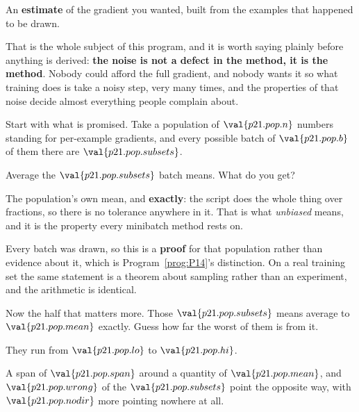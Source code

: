 \begin{fr}
\begin{ansblock}
An \textbf{estimate} of the gradient you wanted, built from the examples that
happened to be drawn.
\end{ansblock}

That is the whole subject of this program, and it is worth saying plainly
before anything is derived: \textbf{the noise is not a defect in the method,
it is the method}. Nobody could afford the full gradient, and nobody wants it
\dash{}
so what training does is take a noisy step, very many times, and the
properties of that noise decide almost everything people complain about.

\end{fr}

\begin{fr}
Start with what is promised. Take a population of $\val{p21.pop.n}$ numbers
standing for per-example gradients, and every possible batch of
$\val{p21.pop.b}$ of them \dash{} there are $\val{p21.pop.subsets}$.

Average the $\val{p21.pop.subsets}$ batch means. What do you get?
\nextframe
\end{fr}

\begin{fr}
The population's own mean, and \textbf{exactly}: the script does the whole
thing over fractions, so there is no tolerance anywhere in it. That is what
\emph{unbiased} means, and it is the property every minibatch method rests on.

\begin{note}
Every batch was drawn, so this is a \textbf{proof} for that population rather
than evidence about it, which is Program~\ref{prog:P14}'s distinction. On a
real training set the same statement is a theorem about sampling rather than
an experiment, and the arithmetic is identical.
\end{note}

Now the half that matters more. Those $\val{p21.pop.subsets}$ means average to
$\val{p21.pop.mean}$ exactly. Guess how far the worst of them is from it.
\dotline
\nextframe
\end{fr}

\begin{fr}
\begin{ansblock}
They run from $\val{p21.pop.lo}$ to $\val{p21.pop.hi}$.
\end{ansblock}


A span of $\val{p21.pop.span}$ around a quantity of $\val{p21.pop.mean}$, and
$\val{p21.pop.wrong}$ of the $\val{p21.pop.subsets}$ point the opposite way,
with $\val{p21.pop.nodir}$ more pointing nowhere at all.
\end{fr}

